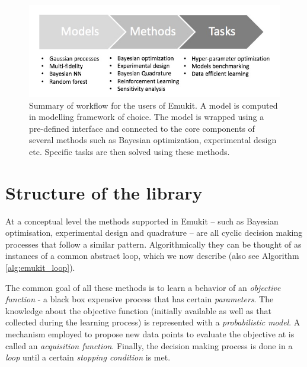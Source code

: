 \begin{figure}[h]
    \centering
    \includegraphics[scale=0.4]{workflow.png}  
    \caption{Summary of workflow for the users of Emukit. A model is computed in modelling framework of choice. The model is wrapped using a pre-defined interface and connected to the core components of several methods such as Bayesian optimization, experimental design etc. Specific tasks are then solved using these methods.}
    \label{figure:workflow}
\end{figure}

\section{Structure of the library}

At a conceptual level the methods supported in Emukit -- such as Bayesian optimisation, experimental design and quadrature -- are all cyclic decision making processes that follow a similar pattern. Algorithmically they can be thought of as instances of a common abstract loop, which we now describe (also see Algorithm \ref{alg:emukit_loop}).

The common goal of all these methods is to learn a behavior of an \textit{objective function} - a black box expensive process that has certain \textit{parameters}. The knowledge about the objective function (initially available as well as that collected during the learning process) is represented with a \textit{probabilistic model}. A mechanism employed to propose new data points to evaluate the objective at is called an \textit{acquisition function}. Finally, the decision making process is done in a \textit{loop} until a certain \textit{stopping condition} is met. 


